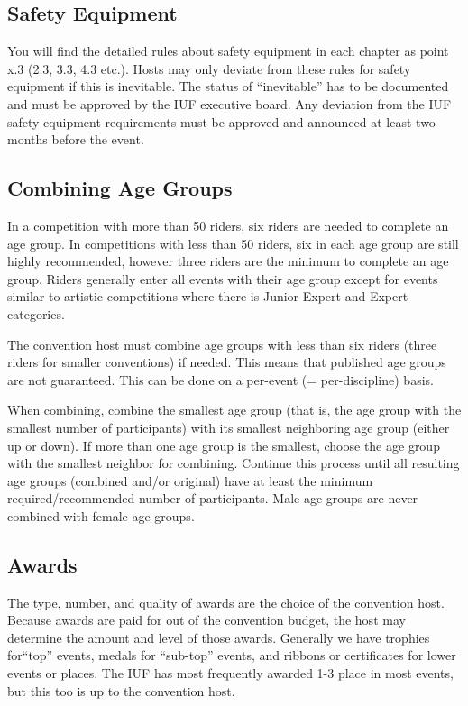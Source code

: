 \subsection{Safety Equipment}
You will find the detailed rules about safety equipment in each chapter as point x.3 (2.3, 3.3, 4.3 etc.).
Hosts may only deviate from these rules for safety equipment if this is inevitable. The status of ``inevitable'' has to be documented and must be approved by the IUF executive board. 
Any deviation from the IUF safety equipment requirements must be approved and announced at least two months before the event.

\subsection{Combining Age Groups \label{subsec:general_host's-option-unicon_combining-age-groups}}
In a competition with more than 50 riders, six riders are needed to complete an age group.
In competitions with less than 50 riders, six in each age group are still highly recommended, however three riders are the minimum to complete an age group.
Riders generally enter all events with their age group except for events similar to artistic competitions where there is Junior Expert and Expert categories.

The convention host must combine age groups with less than six riders (three riders for smaller conventions) if needed.
This means that published age groups are not guaranteed.
This can be done on a per-event (= per-discipline) basis.

When combining, combine the smallest age group (that is, the age group with the smallest number of participants) with its smallest neighboring age group (either up or down).
If more than one age group is the smallest, choose the age group with the smallest neighbor for combining.
Continue this process until all resulting age groups (combined and/or original) have at least the minimum required/recommended number of participants.
Male age groups are never combined with female age groups.

\subsection{Awards}
The type, number, and quality of awards are the choice of the convention host. 
Because awards are paid for out of the convention budget, the host may determine the amount and level of those awards. 
Generally we have trophies for``top'' events, medals for ``sub-top'' events, and ribbons or certificates for lower events or places. 
The IUF has most frequently awarded 1-3 place in most events, but this too is up to the convention host.

